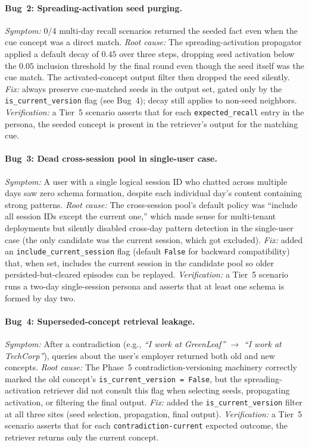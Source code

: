 \documentclass[11pt,twocolumn]{article}
\begin{document}
\paragraph{Bug~2: Spreading-activation seed purging.} \emph{Symptom:} 0/4 multi-day recall scenarios returned the seeded fact even when the cue concept was a direct match. \emph{Root cause:} The spreading-activation propagator applied a default decay of $0.45$ over three steps, dropping seed activation below the $0.05$ inclusion threshold by the final round even though the seed itself was the cue match. The activated-concept output filter then dropped the seed silently. \emph{Fix:} always preserve cue-matched seeds in the output set, gated only by the \texttt{is\_current\_version} flag (see Bug~4); decay still applies to non-seed neighbors. \emph{Verification:} a Tier~5 scenario asserts that for each \texttt{expected\_recall} entry in the persona, the seeded concept is present in the retriever's output for the matching cue.

\paragraph{Bug~3: Dead cross-session pool in single-user case.} \emph{Symptom:} A user with a single logical session ID who chatted across multiple days saw zero schema formation, despite each individual day's content containing strong patterns. \emph{Root cause:} The cross-session pool's default policy was ``include all session IDs except the current one,'' which made sense for multi-tenant deployments but silently disabled cross-day pattern detection in the single-user case (the only candidate was the current session, which got excluded). \emph{Fix:} added an \texttt{include\_current\_session} flag (default \texttt{False} for backward compatibility) that, when set, includes the current session in the candidate pool so older persisted-but-cleared episodes can be replayed. \emph{Verification:} a Tier~5 scenario runs a two-day single-session persona and asserts that at least one schema is formed by day two.

\paragraph{Bug~4: Superseded-concept retrieval leakage.} \emph{Symptom:} After a contradiction (e.g., \textit{``I work at GreenLeaf''} $\to$ \textit{``I work at TechCorp''}), queries about the user's employer returned both old and new concepts. \emph{Root cause:} The Phase~5 contradiction-versioning machinery correctly marked the old concept's \texttt{is\_current\_version = False}, but the spreading-activation retriever did not consult this flag when selecting seeds, propagating activation, or filtering the final output. \emph{Fix:} added the \texttt{is\_current\_version} filter at all three sites (seed selection, propagation, final output). \emph{Verification:} a Tier~5 scenario asserts that for each \texttt{contradiction-current} expected outcome, the retriever returns only the current concept.
\end{document}
